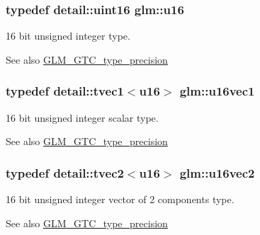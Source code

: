 \subsubsection[{u16}]{\setlength{\rightskip}{0pt plus 5cm}typedef detail\+::uint16 {\bf glm\+::u16}}\label{group__gtc__type__precision_gae7a1571503f83d2264ddfa705a6b082a}
16 bit unsigned integer type. \begin{DoxySeeAlso}{See also}
\hyperlink{group__gtc__type__precision}{G\+L\+M\+\_\+\+G\+T\+C\+\_\+type\+\_\+precision} 
\end{DoxySeeAlso}
\hypertarget{group__gtc__type__precision_gadfda7307e98ab4ab001bf16e8af84b64}{}
\subsubsection[{u16vec1}]{\setlength{\rightskip}{0pt plus 5cm}typedef detail\+::tvec1$<$u16$>$ {\bf glm\+::u16vec1}}\label{group__gtc__type__precision_gadfda7307e98ab4ab001bf16e8af84b64}
16 bit unsigned integer scalar type. \begin{DoxySeeAlso}{See also}
\hyperlink{group__gtc__type__precision}{G\+L\+M\+\_\+\+G\+T\+C\+\_\+type\+\_\+precision} 
\end{DoxySeeAlso}
\hypertarget{group__gtc__type__precision_gac4edd601deebcb0c6406814aeb28edc5}{}
\subsubsection[{u16vec2}]{\setlength{\rightskip}{0pt plus 5cm}typedef detail\+::tvec2$<$u16$>$ {\bf glm\+::u16vec2}}\label{group__gtc__type__precision_gac4edd601deebcb0c6406814aeb28edc5}
16 bit unsigned integer vector of 2 components type. \begin{DoxySeeAlso}{See also}
\hyperlink{group__gtc__type__precision}{G\+L\+M\+\_\+\+G\+T\+C\+\_\+type\+\_\+precision} 
\end{DoxySeeAlso}
\hypertarget{group__gtc__type__precision_gadce584ceb1de400c392cb2df1b343df9}{}
